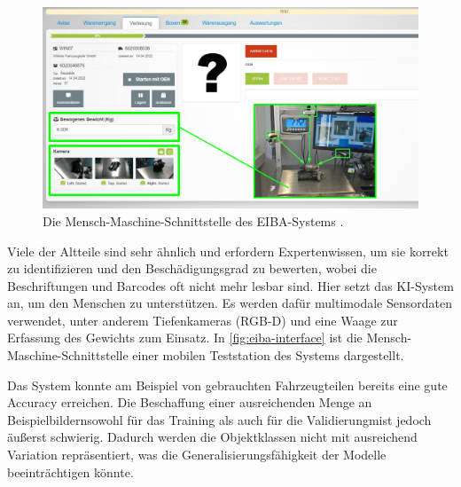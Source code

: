 \begin{figure}[b!]
	\centering
	\includegraphics[width=\textwidth]{figure_eiba_interface.png}
	\caption[Die Mensch-Maschine-Schnittstelle des EIBA-Systems.]{Die Mensch-Maschine-Schnittstelle des EIBA-Systems \parencite{Wagner2022reziprok}.}
	\label{fig:eiba-interface}
\end{figure}

Viele der Altteile sind sehr ähnlich und erfordern Expertenwissen, um sie korrekt zu identifizieren und den Beschädigungsgrad zu bewerten, wobei die Beschriftungen und Barcodes oft nicht mehr lesbar sind. Hier setzt das KI-System an, um den Menschen zu unterstützen. Es werden dafür multimodale Sensordaten verwendet, unter anderem Tiefenkameras (RGB-D) und eine Waage zur Erfassung des Gewichts zum Einsatz. In \autoref{fig:eiba-interface} ist die Mensch-Maschine-Schnittstelle einer mobilen Teststation des Systems dargestellt.

Das System konnte am Beispiel von gebrauchten Fahrzeugteilen bereits eine gute Accuracy erreichen. Die Beschaffung einer ausreichenden Menge an Beispielbildern\textemdash sowohl für das Training als auch für die Validierung\textemdash mist jedoch äußerst schwierig. Dadurch werden die Objektklassen nicht mit ausreichend Variation repräsentiert, was die Generalisierungsfähigkeit der Modelle beeinträchtigen könnte.


